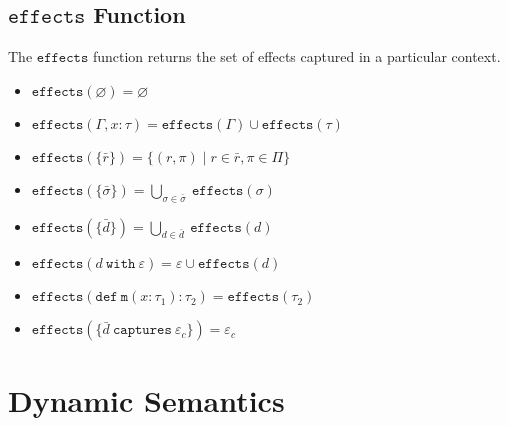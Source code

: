 \documentclass{llncs}
\newcommand{\keywadj}[1]{\mathtt{#1}}
\newcommand{\keyw}[1]{\keywadj{#1}~}
\begin{document}
\subsection{$\keywadj{effects}$ Function}

\noindent
The $\keywadj{effects}$ function returns the set of effects captured in a particular context.

\begin{itemize}
	\item $\keywadj{effects}(\varnothing) = \varnothing$
	\item $\keywadj{effects}(\Gamma, x : \tau) = \keywadj{effects}(\Gamma) \cup \keywadj{effects}(\tau)$
	\item $\keywadj{effects}(\{\bar r\}) = \{ (r, \pi) \mid r \in \bar r, \pi \in \Pi \}$
	\item $\keywadj{effects}(\{\bar \sigma\}) = \bigcup_{\sigma \in \bar \sigma}~\keywadj{effects}(\sigma)$
	\item $\keywadj{effects}(\{\bar d\}) = \bigcup_{d \in \bar d}~\keywadj{effects}(d)$
	\item $\keywadj{effects}(d~\keyw{with} \varepsilon) = \varepsilon \cup \keywadj{effects}(d)$
	\item $\keywadj{effects}(\keywadj{def~m}(x : \tau_1) : \tau_2) = \keywadj{effects}(\tau_2)$
	\item $\keywadj{effects}(\{\bar d ~\keyw{captures} \varepsilon_c\}) = \varepsilon_c$
\end{itemize}

\section{Dynamic Semantics}

~\\
\noindent
{}
\end{document}
